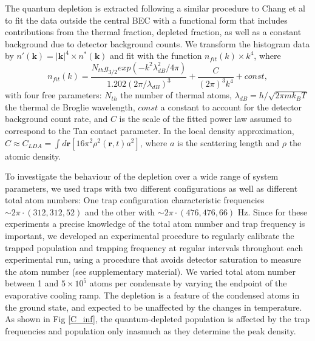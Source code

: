 \documentclass[%
	 aps,%
	 prl,%
	 a4paper,%
	 amsmath,amssymb,%
	 preprint,%
	 reprint,%
]{revtex4-1}
\begin{document}
The quantum depletion is extracted following a similar procedure to Chang et al \cite{Chang2016} to fit the data outside the central BEC with a functional form that includes contributions from the thermal fraction, depleted fraction, as well as a constant background due to detector background counts.  We transform the histogram data by $n'(\textbf{k}) = |\textbf{k}|^4\times n^*(\textbf{k})$ and fit with the function $n_{fit}(k)\times k^4$, where
$$
n_{fit}(k) = \frac{N_{th}g_{3/2}exp(-k^2 \lambda_{dB} ^2 /4\pi)}{1.202(2\pi/\lambda_{dB})^3} + \frac{C}{(2\pi)^3 k^4} + const, 
$$
with four free parameters: $N_{th}$ the number of thermal atoms, $\lambda_{dB} = h/\sqrt{2\pi m k_B T}$ the thermal de Broglie wavelength, $const$  a constant to account for the detector background count rate, and $C$ is the scale of the fitted power law assumed to correspond to the Tan contact parameter. In the local density approximation, $C \approx C_{LDA} = \int d\textbf{r} [16\pi^2 \rho^2(\textbf{r},t)a^2]$, where $a$ is the scattering length and $\rho$ the atomic density. 

To investigate the behaviour of the depletion over a wide range of system parameters, we used traps with two different configurations as well as different total atom numbers:  One trap configuration characteristic frequencies $ \sim 2\pi\cdot (312,312,52)$ and the other with $\sim 2\pi\cdot (476,476,66)$ Hz. Since for these experiments a precise knowledge of the total atom number and trap frequency is important, we developed an experimental procedure to regularly calibrate the trapped population and trapping frequency at regular intervals throughout each experimental run, using a procedure that avoids detector saturation to measure the atom number (see supplementary material).  We varied total atom number  between 1 and $5\times 10^5$ atoms per condensate by varying the endpoint of the evaporative cooling ramp.
The depletion is a feature of the condensed atoms in the ground state, and expected to be unaffected by the changes in temperature.    As shown in Fig \ref{C_inf}, the quantum-depleted population is affected by the trap frequencies and population only inasmuch as they determine the peak density.
\end{document}
